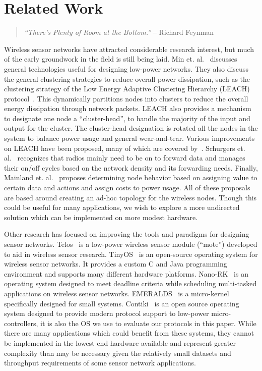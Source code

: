 \section{Related Work}

\begin{quote}
\emph{``There's Plenty of Room at the Bottom.''} – Richard Feynman
\end{quote}

Wireless sensor networks have attracted considerable research interest, but much of the early groundwork in the field
is still being laid.  Min et. al.~\cite{min01} discusses general technologies useful for designing low-power networks.
They also discuss the general clustering strategies to reduce overall power dissipation, such as the clustering strategy
of the Low Energy Adaptive Clustering Hierarchy (LEACH) protocol~\cite{heinzelman00}.  This dynamically partitions nodes
into clusters to reduce the overall energy dissipation through network packets.  LEACH also provides a mechanism to
designate one node a ``cluster-head'', to handle the majority of the input and output for the cluster.  The cluster-head
designation is rotated all the nodes in the system to balance power usage and general wear-and-tear.  Various improvements
on LEACH have been proposed, many of which are covered by~\cite{ramesh11}.  Schurgers et. al.~\cite{schurgers02} recognizes
that radios mainly need to be on to forward data and manages their on/off cycles based on the network density and its
forwarding needs.  Finally, Mainland et. al.~\cite{mainland05} proposes determining node behavior based on assigning value
to certain data and actions and assign costs to power usage.
All of these proposals are based around creating an ad-hoc topology for the wireless nodes.  Though
this could be useful for many applications, we wish to explore a more undirected solution which can be implemented on more
modest hardware.


Other research has focused on improving the tools and paradigms for designing sensor networks.  Telos~\cite{telos} is a
low-power wireless sensor module (``mote'') developed to aid in wireless sensor research.  TinyOS~\cite{tinyos} is an
open-source operating system for wireless sensor networks.  It provides a custom C and Java programming environment and
supports many different hardware platforms.  Nano-RK~\cite{eswaran05} is an operating system designed to meet deadline
criteria while scheduling multi-tasked applications on wireless sensor networks.  EMERALDS~\cite{zuberi99} is a
micro-kernel specifically designed for small systems.  Contiki~\cite{contiki} is an open source operating system designed
to provide modern protocol support to low-power micro-controllers, it is also the OS we use to evaluate our protocols
in this paper.
While there are many applications which could benefit from these
systems, they cannot be implemented in the lowest-end hardware available and represent greater complexity than may be
necessary given the relatively small datasets and throughput requirements of some sensor network applications.

